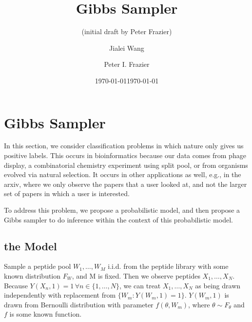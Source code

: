 \documentclass[12pt]{article}
\title{Gibbs Sampler}
\date{\today}
\author{(initial draft by Peter Frazier)} %
\author{Jialei Wang \and
Peter I. Frazier
}
\date{\today}
\begin{document}
\maketitle
\section{Gibbs Sampler}
In this section, we consider classification problems in which nature only gives us positive labels.  This occurs in bioinformatics because our data comes from phage display, a combinatorial chemistry experiment using split pool, or from organisms evolved via natural selection.  It occurs in other applications as well, e.g., in the arxiv, where we only observe the papers that a user looked at, and not the larger set of papers in which a user is interested.

To address this problem, we propose a probabilistic model, and then propose a Gibbs sampler to do inference within the context of this probabilistic model.
\subsection{the Model}
Sample a peptide pool $W_1, \ldots, W_M$ i.i.d. from the peptide library with some known distribution $F_W$, and M is fixed. Then we observe peptides $X_1, \ldots, X_N$. Because $Y(X_n,1)=1 \, \forall n \in \{1,\ldots,N\}$, we can treat $X_1,\ldots,X_N$ as being drawn independently with replacement from $\{W_m: Y(W_m,1)=1\}$. $Y(W_m,1)$ is drawn from Bernoulli distribution with parameter $f(\theta,W_m)$, where $\theta \sim F_{\theta}$ and $f$ is some known function.
\end{document}
